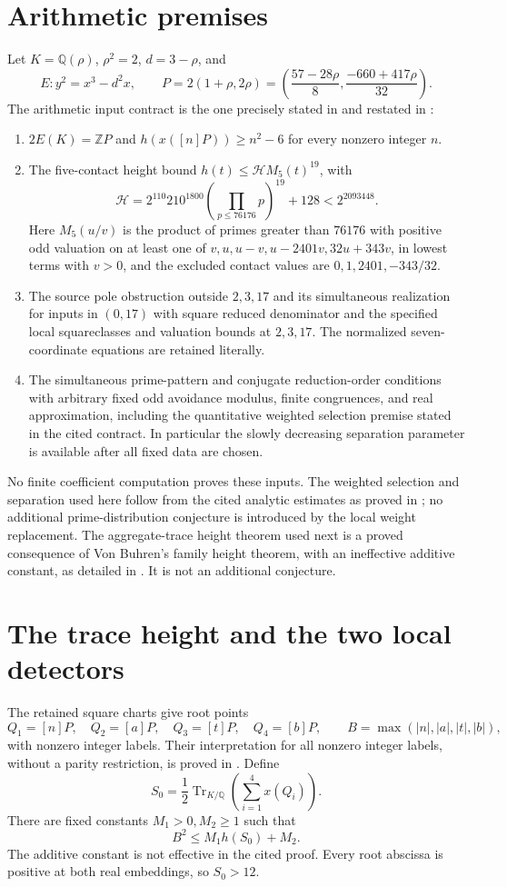 \documentclass[11pt,a4paper]{article}
\theoremstyle{remark}\newtheorem{remark}[theorem]{Remark}
\newcommand{\Q}{\mathbb Q}\newcommand{\Z}{\mathbb Z}\newcommand{\HH}{\mathcal H}
\DeclareMathOperator{\Tr}{Tr}
\begin{document}
\section{Arithmetic premises}\label{sec:premises}
Let $K=\Q(\rho)$, $\rho^2=2$, $d=3-\rho$, and
\[
 E:y^2=x^3-d^2x,\qquad
 P=2(1+\rho,2\rho)
   =\left(\frac{57-28\rho}{8},\frac{-660+417\rho}{32}\right).
\]
The arithmetic input contract is the one precisely stated in
\cite[Section~2]{Source} and restated in \cite[Section~2]{Explicit}:
\begin{enumerate}
\item $2E(K)=\Z P$ and $h(x([n]P))\ge n^2-6$ for every nonzero
integer $n$.
\item The five-contact height bound $h(t)\le\HH M_5(t)^{19}$, with
\[
 \HH=2^{110}210^{1800}\left(\prod_{p\le76176}p\right)^{19}+128
       <2^{2093448}.
\]
Here $M_5(u/v)$ is the product of primes greater than $76176$ with
positive odd valuation on at least one of
$v,u,u-v,u-2401v,32u+343v$, in lowest terms with $v>0$, and the
excluded contact values are $0,1,2401,-343/32$.
\item The source pole obstruction outside $2,3,17$ and its simultaneous
realization for inputs in $(0,17)$ with square reduced denominator and
the specified local squareclasses and valuation bounds at $2,3,17$.
The normalized seven-coordinate equations are retained literally.
\item The simultaneous prime-pattern and conjugate reduction-order
conditions with arbitrary fixed odd avoidance modulus, finite congruences,
and real approximation, including the quantitative weighted selection
premise stated in the cited contract. In particular the slowly decreasing
separation parameter is available after all fixed data are chosen.
\end{enumerate}
No finite coefficient computation proves these inputs. The weighted selection and
separation used here follow from the cited analytic estimates as proved
in \cite{Selection}; no additional prime-distribution conjecture is
introduced by the local weight replacement. The
aggregate-trace height theorem used next is a proved consequence of
Von Buhren's family height theorem, with an ineffective additive constant,
as detailed in \cite{Aggregate}. It is not an additional conjecture.

\section{The trace height and the two local detectors}
The retained square charts give root points
\[
 Q_1=[n]P,\quad Q_2=[a]P,\quad Q_3=[t]P,\quad Q_4=[b]P,
 \qquad B=\max(|n|,|a|,|t|,|b|),
\]
with nonzero integer labels. Their interpretation for all nonzero
integer labels, without a parity restriction, is proved in
\cite[Section~2]{Baseline}. Define
\[
 S_0=\frac12\Tr_{K/\Q}\left(\sum_{i=1}^4x(Q_i)\right).
\]
There are fixed constants $M_1>0,M_2\ge1$ such that
\begin{equation}\label{eq:traceheight}
                           B^2\le M_1h(S_0)+M_2.
\end{equation}
The additive constant is not effective in the cited proof. Every root
abscissa is positive at both real embeddings, so $S_0>12$.
\end{document}
